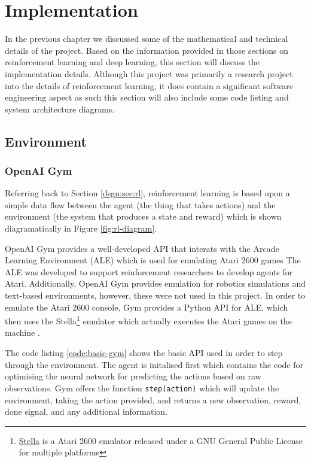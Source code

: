 \chapter{Implementation}
In the previous chapter we discussed some of the mathematical and technical details of the project. Based on the information provided in those sections on reinforcement learning and deep learning, this section will discuss the implementation details. Although this project was primarily a research project into the details of reinforcement learning, it does contain a significant software engineering aspect as such this section will also include some code listing and system architecture diagrams.

\section{Environment}
\subsection{OpenAI Gym}
Referring back to Section \ref{dsgn:sec:rl}, reinforcement learning is based upon a simple data flow between the agent (the thing that takes actions) and the environment (the system that produces a state and reward) which is shown diagramatically in Figure \ref{fig:rl-diagram}.

OpenAI Gym provides a well-developed API that interats with the Arcade Learning Environment (ALE) which is used for emulating Atari 2600 games The ALE was developed to support reinforcement researchers to develop agents for Atari\cite{bellemare13arcade}\cite{machado2017revisiting}. Additionally, OpenAI Gym provides emulation for robotics simulations and text-based environments, however, these were not used in this project. In order to emulate the Atari 2600 console, Gym provides a Python API for ALE, which then uses the Stella\footnote{\href{https://stella-emu.github.io/}{Stella} is a Atari 2600 emulator released under a GNU General Public License for multiple platforms} emulator which actually executes the Atari games on the machine \cite{brockman2016openai}.

The code listing \ref{code:basic-gym} shows the basic API used in order to step through the environment. The agent is initalised first which contains the code for optimising the neural network for predicting the actions based on raw observations. Gym offers the function \texttt{step(action)} which will update the environment, taking the action provided, and returns a new observation, reward, done signal, and any additional information.

